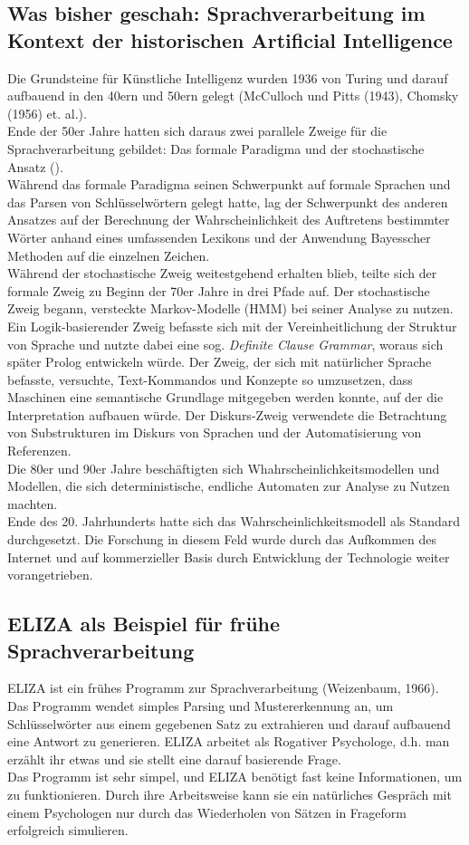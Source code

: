 \documentclass[12pt,twoside]{article}
\theoremstyle{plain}
\theoremstyle{definition}
\theoremstyle{remark}
\begin{document}
	\subsection{Was bisher geschah: Sprachverarbeitung im Kontext der historischen Artificial Intelligence}
	\label{ssec:history}
	Die Grundsteine für Künstliche Intelligenz wurden 1936 von Turing und darauf aufbauend in den 40ern und 50ern gelegt (McCulloch und Pitts (1943), Chomsky (1956) et. al.).\\
	Ende der 50er Jahre hatten sich daraus zwei parallele Zweige für die Sprachverarbeitung gebildet: Das formale Paradigma und der stochastische Ansatz (\cite{Jur2009}).\\
	Während das formale Paradigma seinen Schwerpunkt auf formale Sprachen und das Parsen von Schlüsselwörtern gelegt hatte, lag der Schwerpunkt des anderen Ansatzes auf der Berechnung der Wahrscheinlichkeit des Auftretens bestimmter Wörter anhand eines umfassenden Lexikons und der Anwendung Bayesscher Methoden auf die einzelnen Zeichen.\\
	Während der stochastische Zweig weitestgehend erhalten blieb, teilte sich der formale Zweig zu Beginn der 70er Jahre in drei Pfade auf.
	Der stochastische Zweig begann, versteckte Markov-Modelle (HMM) bei seiner Analyse zu nutzen.
	Ein Logik-basierender Zweig befasste sich mit der Vereinheitlichung der Struktur von Sprache und nutzte dabei eine sog. \textit{Definite Clause Grammar}, woraus sich später Prolog entwickeln würde.
	Der Zweig, der sich mit natürlicher Sprache befasste, versuchte, Text-Kommandos und Konzepte so umzusetzen, dass Maschinen eine semantische Grundlage mitgegeben werden konnte, auf der die Interpretation aufbauen würde.
	Der Diskurs-Zweig verwendete die Betrachtung von Substrukturen im Diskurs von Sprachen und der Automatisierung von Referenzen.\\
	Die 80er und 90er Jahre beschäftigten sich Whahrscheinlichkeitsmodellen und Modellen, die sich deterministische, endliche Automaten zur Analyse zu Nutzen machten.\\
	Ende des 20. Jahrhunderts hatte sich das Wahrscheinlichkeitsmodell als Standard durchgesetzt. Die Forschung in diesem Feld wurde durch das Aufkommen des Internet und auf kommerzieller Basis durch Entwicklung der Technologie weiter vorangetrieben.
	\subsection{ELIZA als Beispiel für frühe Sprachverarbeitung}
	\label{ssec:eliza}
	ELIZA ist ein frühes Programm zur Sprachverarbeitung (Weizenbaum, 1966).
	Das Programm wendet simples Parsing und Mustererkennung an, um Schlüsselwörter aus einem gegebenen Satz zu extrahieren und darauf aufbauend eine Antwort zu generieren.
	ELIZA arbeitet als Rogativer Psychologe, d.h. man erzählt ihr etwas und sie stellt eine darauf basierende Frage.\\
	Das Programm ist sehr simpel, und ELIZA benötigt fast keine Informationen, um zu funktionieren.
	Durch ihre Arbeitsweise kann sie ein natürliches Gespräch mit einem Psychologen nur durch das Wiederholen von Sätzen in Frageform erfolgreich simulieren.
\end{document}
